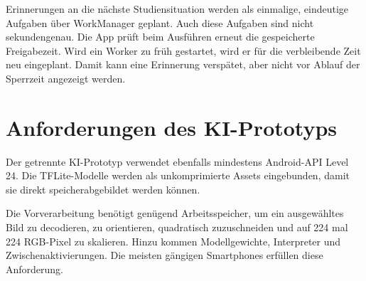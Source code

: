 Erinnerungen an die nächste Studiensituation werden als einmalige, eindeutige Aufgaben über WorkManager geplant. Auch diese Aufgaben sind nicht sekundengenau. Die App prüft beim Ausführen erneut die gespeicherte Freigabezeit. Wird ein Worker zu früh gestartet, wird er für die verbleibende Zeit neu eingeplant. Damit kann eine Erinnerung verspätet, aber nicht vor Ablauf der Sperrzeit angezeigt werden.

\section{Anforderungen des KI-Prototyps}
Der getrennte KI-Prototyp verwendet ebenfalls mindestens Android-API Level 24. Die TFLite-Modelle werden als unkomprimierte Assets eingebunden, damit sie direkt speicherabgebildet werden können.

Die Vorverarbeitung benötigt genügend Arbeitsspeicher, um ein ausgewähltes Bild zu decodieren, zu orientieren, quadratisch zuzuschneiden und auf 224 mal 224 RGB-Pixel zu skalieren. Hinzu kommen Modellgewichte, Interpreter und Zwischenaktivierungen. Die meisten gängigen Smartphones erfüllen diese Anforderung.

